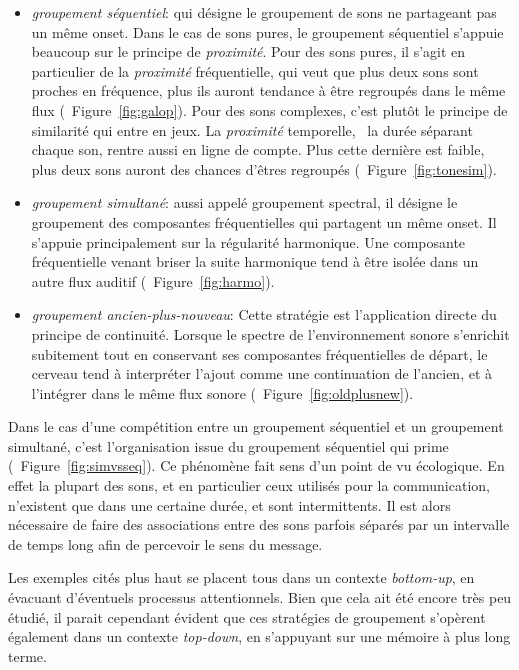 \begin{itemize}
\item \emph{groupement séquentiel}: qui désigne le groupement de sons ne partageant pas un même onset. Dans le cas de sons pures, le groupement séquentiel s'appuie beaucoup sur le principe de \emph{proximité}. Pour des sons pures, il s'agit en particulier de la \emph{proximité} fréquentielle, qui veut que plus deux sons sont proches en fréquence, plus ils auront tendance à être regroupés dans le même flux (\Cf~Figure~\ref{fig:galop}). Pour des sons complexes, c'est plutôt le principe de similarité qui entre en jeux. La \emph{proximité} temporelle, \ie~la durée séparant chaque son, rentre aussi en ligne de compte. Plus cette dernière est faible, plus deux sons auront des chances d'êtres regroupés (\Cf~Figure~\ref{fig:tonesim}).
\item \emph{groupement simultané}: aussi appelé groupement spectral, il désigne le groupement des composantes fréquentielles qui partagent un même onset. Il s'appuie principalement sur la régularité harmonique. Une composante fréquentielle venant briser la suite harmonique tend à être isolée dans un autre flux auditif (\Cf~Figure~\ref{fig:harmo}).
\item \emph{groupement ancien-plus-nouveau}: Cette stratégie est l'application directe du principe de continuité. Lorsque le spectre de l'environnement sonore s’enrichit subitement tout en conservant ses composantes fréquentielles de départ, le cerveau tend à interpréter l'ajout comme une continuation de l'ancien, et à l'intégrer dans le même flux sonore (\Cf~Figure~\ref{fig:oldplusnew}).
\end{itemize}

Dans le cas d'une compétition entre un groupement séquentiel et un groupement simultané, c'est l'organisation issue du groupement séquentiel qui prime (\Cf~Figure~\ref{fig:simvsseq}). Ce phénomène fait sens d'un point de vu écologique. En effet la plupart des sons, et en particulier ceux utilisés pour la communication, n'existent que dans une certaine durée, et sont intermittents. Il est alors nécessaire de faire des associations entre des sons parfois séparés par un intervalle de temps long afin de percevoir le sens du message. \citep{winkler2009modeling}

Les exemples cités plus haut se placent tous dans un contexte \emph{bottom-up}, en évacuant d'éventuels processus attentionnels. Bien que cela ait été encore très peu étudié, il parait cependant évident que ces stratégies de groupement s’opèrent également  dans un contexte \emph{top-down}, en s'appuyant sur une mémoire à plus long terme.


